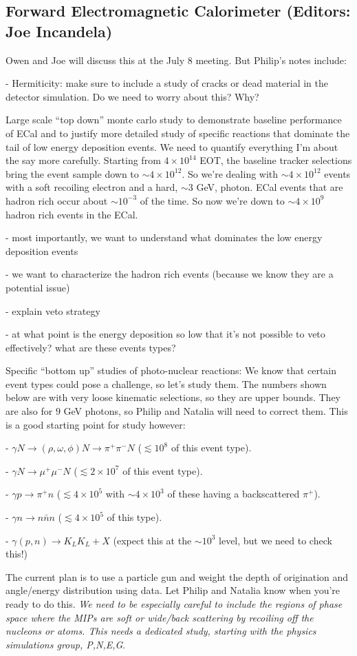 
\subsection{Forward Electromagnetic Calorimeter (Editors: Joe Incandela)}

Owen and Joe will discuss this at the July 8 meeting. But Philip's notes include: 

- Hermiticity:  make sure to include a study of cracks or dead material in the detector simulation. Do we need to worry about this? Why? 

Large scale ``top down'' monte carlo study to demonstrate baseline performance of ECal and to justify more detailed study of specific reactions that dominate the tail of low energy deposition events. We need to quantify everything I'm about the say more carefully. Starting from $4\times 10^{14}$ EOT, the baseline tracker selections bring the event sample down to $\sim 4 \times 10^{12}$. So we're dealing with $\sim 4 \times 10^{12}$ events with a soft recoiling electron and a hard, $\sim 3$ GeV, photon. ECal events that are hadron rich occur about $\sim10^{-3}$ of the time. So now we're down to $\sim 4\times 10^{9}$ hadron rich events in the ECal. 

- most importantly, we want to understand what dominates the low energy deposition events

- we want to characterize the hadron rich events (because we know they are a potential issue)

- explain veto strategy

- at what point is the energy deposition so low that it's not possible to veto effectively? what are these events types? 

Specific ``bottom up'' studies of photo-nuclear reactions:  We know that certain event types could pose a challenge, so let's study them. The numbers shown below are with very loose kinematic selections, so they are upper bounds. They are also for $9$ GeV photons, so Philip and Natalia will need to correct them. This is a good starting point for study however: 

- $\gamma N \rightarrow (\rho,\omega,\phi)N\rightarrow \pi^+\pi^- N$ ($\lesssim 10^8$ of this event type). 

- $\gamma N \rightarrow  \mu^+\mu^- N$ ($\lesssim 2 \times 10^7$ of this event type). 

- $\gamma p \rightarrow \pi^+ n$ ($\lesssim 4\times 10^5$ with $\sim 4\times 10^3$ of these having a backscattered $\pi^+$). 

- $\gamma n \rightarrow n \bar{n} n$ ($\lesssim 4\times 10^5$ of this type). 

- $\gamma (p,n) \rightarrow K_L K_L + X$ (expect this at the $\sim 10^3$ level, but we need to check this!)

The current plan is to use a particle gun and weight the depth of origination and angle/energy distribution using data. Let Philip and Natalia know when you're ready to do this. 
{\it We need to be especially careful to include the regions of phase space where the MIPs are soft or wide/back scattering by recoiling off the nucleons or atoms. This needs a dedicated study, starting with the physics simulations group, P,N,E,G}. 


